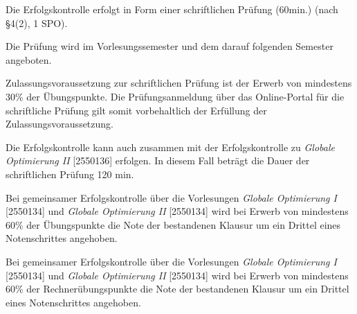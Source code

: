 \begin{course}

\setdoclanguagegerman
{}



\coursehead


\label{cour_7879.dp_997}


\begin{styleenv}
\begin{assessment}
Die Erfolgskontrolle erfolgt in Form einer schriftlichen Prüfung (60min.) (nach §4(2), 1 SPO).

 

Die Prüfung wird im Vorlesungssemester und dem darauf folgenden Semester angeboten.

 

Zulassungsvoraussetzung zur schriftlichen Prüfung ist der Erwerb von mindestens 30\% der Übungspunkte. Die Prüfungsanmeldung über das Online-Portal für die schriftliche Prüfung gilt somit vorbehaltlich der Erfüllung der Zulassungsvoraussetzung.

 

Die Erfolgskontrolle kann auch zusammen mit der Erfolgskontrolle zu \emph{Globale Optimierung II} [2550136] erfolgen. In diesem Fall beträgt die Dauer der schriftlichen Prüfung 120 min.

 

Bei gemeinsamer Erfolgskontrolle über die Vorlesungen \emph{Globale Optimierung I} [2550134] und \emph{Globale Optimierung II} [2550134] wird bei Erwerb von mindestens 60\% der Übungspunkte die Note der bestandenen Klausur um ein Drittel eines Notenschrittes angehoben.

 

Bei gemeinsamer Erfolgskontrolle über die Vorlesungen \emph{Globale Optimierung I} [2550134] und \emph{Globale Optimierung II} [2550134] wird bei Erwerb von mindestens 60\% der Rechnerübungspunkte die Note der bestandenen Klausur um ein Drittel eines Notenschrittes angehoben.



\end{assessment}
\end{styleenv}
\end{course}
